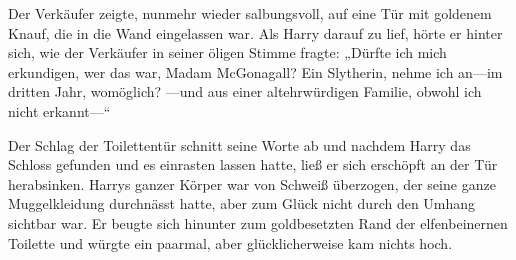 Der Verkäufer zeigte, nunmehr wieder salbungsvoll, auf eine Tür mit goldenem Knauf, die in die Wand eingelassen war. Als Harry darauf zu lief, hörte er hinter sich, wie der Verkäufer in seiner öligen Stimme fragte: „Dürfte ich mich erkundigen, wer das war, Madam McGonagall? Ein Slytherin, nehme ich an—im dritten Jahr, womöglich? —und aus einer altehrwürdigen Familie, obwohl ich nicht erkannt—“

Der Schlag der Toilettentür schnitt seine Worte ab und nachdem Harry das Schloss gefunden und es einrasten lassen hatte, ließ er sich erschöpft an der Tür herabsinken. Harrys ganzer Körper war von Schweiß überzogen, der seine ganze Muggelkleidung durchnässt hatte, aber zum Glück nicht durch den Umhang sichtbar war. Er beugte sich hinunter zum goldbesetzten Rand der elfenbeinernen Toilette und würgte ein paarmal, aber glücklicherweise kam nichts hoch.

\later

